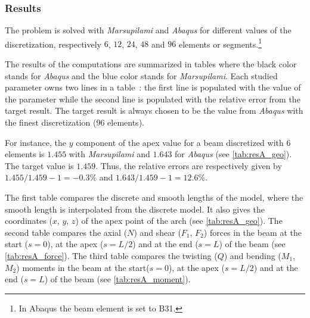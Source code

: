 
\subsubsection{Results}

The problem is solved with \emph{Marsupilami} and \emph{Abaqus} for different values of the discretization, respectively $6$, $12$, $24$, $48$ and $96$ elements or segments.\footnote{In Abaqus the beam element is set to B31.}

The results of the computations are summarized in tables where the black color stands for \emph{Abaqus} and the blue color stands for \emph{Marsupilami}. Each studied parameter owns two lines in a table~: the first line is populated with the value of the parameter while the second line is populated with the relative error from the target result. The target result is always chosen to be the value from \emph{Abaqus} with the finest discretization ($96$ elements).

For instance, the $y$ component of the apex value for a beam discretized with $6$ elements is $1.455$ with \emph{Marsupilami} and $1.643$ for \emph{Abaqus} (see \cref{tab:resA_geo}). The target value is $1.459$. Thus, the relative errors are respectively given by $1.455/1.459 -1 = -0.3\%$ and $1.643/1.459 -1 = 12.6\%$.

The first table compares the discrete and smooth lengths of the model, where the smooth length is interpolated from the discrete model. It also gives the coordinates ($x$, $y$, $z$) of the apex point of the arch (see \cref{tab:resA_geo}). The second table compares the axial ($N$) and shear ($F_1$, $F_2$) forces in the beam at the start ($s=0$), at the apex ($s=L/2$) and at the end ($s=L$) of the beam (see \cref{tab:resA_force}). The third table compares the twisting ($Q$) and bending ($M_1$, $M_2$) moments in the beam at the start($s=0$), at the apex ($s=L/2$) and at the end ($s=L$) of the beam (see \cref{tab:resA_moment}).

